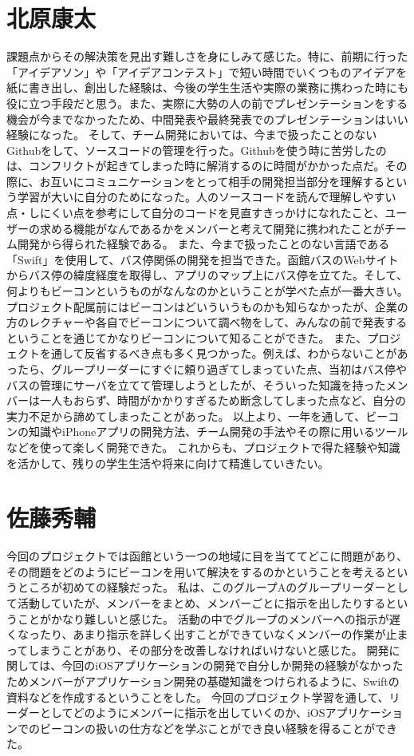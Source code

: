 \documentclass[openany,11pt,papersize]{jsbook}
\begin{document}

\section{北原康太}
課題点からその解決策を見出す難しさを身にしみて感じた。特に、前期に行った「アイデアソン」や「アイデアコンテスト」で短い時間でいくつものアイデアを紙に書き出し、創出した経験は、今後の学生生活や実際の業務に携わった時にも役に立つ手段だと思う。また、実際に大勢の人の前でプレゼンテーションをする機会が今までなかったため、中間発表や最終発表でのプレゼンテーションはいい経験になった。 
そして、チーム開発においては、今まで扱ったことのないGithubをして、ソースコードの管理を行った。Githubを使う時に苦労したのは、コンフリクトが起きてしまった時に解消するのに時間がかかった点だ。その際に、お互いにコミュニケーションをとって相手の開発担当部分を理解するという学習が大いに自分のためになった。人のソースコードを読んで理解しやすい点・しにくい点を参考にして自分のコードを見直すきっかけになれたこと、ユーザーの求める機能がなんであるかをメンバーと考えて開発に携われたことがチーム開発から得られた経験である。 
また、今まで扱ったことのない言語である「Swift」を使用して、バス停関係の開発を担当できた。函館バスのWebサイトからバス停の緯度経度を取得し、アプリのマップ上にバス停を立てた。そして、何よりもビーコンというものがなんなのかということが学べた点が一番大きい。プロジェクト配属前にはビーコンはどいういうものかも知らなかったが、企業の方のレクチャーや各自でビーコンについて調べ物をして、みんなの前で発表するということを通じてかなりビーコンについて知ることができた。 
また、プロジェクトを通して反省するべき点も多く見つかった。例えば、わからないことがあったら、グループリーダーにすぐに頼り過ぎてしまっていた点、当初はバス停やバスの管理にサーバを立てて管理しようとしたが、そういった知識を持ったメンバーは一人もおらず、時間がかかりすぎるため断念してしまった点など、自分の実力不足から諦めてしまったことがあった。 
以上より、一年を通して、ビーコンの知識やiPhoneアプリの開発方法、チーム開発の手法やその際に用いるツールなどを使って楽しく開発できた。 
これからも、プロジェクトで得た経験や知識を活かして、残りの学生生活や将来に向けて精進していきたい。 


\section{佐藤秀輔}
今回のプロジェクトでは函館という一つの地域に目を当ててどこに問題があり、その問題をどのようにビーコンを用いて解決をするのかということを考えるというところが初めての経験だった。
私は、このグループAのグループリーダーとして活動していたが、メンバーをまとめ、メンバーごとに指示を出したりするということがかなり難しいと感じた。
活動の中でグループのメンバーへの指示が遅くなったり、あまり指示を詳しく出すことができていなくメンバーの作業が止まってしまうことがあり、その部分を改善しなければいけないと感じた。
開発に関しては、今回のiOSアプリケーションの開発で自分しか開発の経験がなかったためメンバーがアプリケーション開発の基礎知識をつけられるように、Swiftの資料などを作成するということをした。
今回のプロジェクト学習を通して、リーダーとしてどのようにメンバーに指示を出していくのか、iOSアプリケーションでのビーコンの扱いの仕方などを学ぶことができ良い経験を得ることができた。
\end{document}

